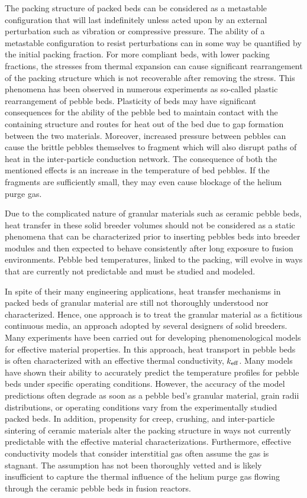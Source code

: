 The packing structure of packed beds can be considered as a metastable configuration that will last indefinitely unless acted upon by an external perturbation such as vibration or compressive pressure.\cite{Jaeger1996} The ability of a metastable configuration to resist perturbations can in some way be quantified by the initial packing fraction. For more compliant beds, with lower packing fractions, the stresses from thermal expansion can cause significant rearrangement of the packing structure which is not recoverable after removing the stress. This phenomena has been observed in numerous experiments as so-called plastic rearrangement of pebble beds.\cite{Reimann:2002kl,Reimann:2000tw,Zhang2015} Plasticity of beds may have significant consequences for the ability of the pebble bed to maintain contact with the containing structure and routes for heat out of the bed due to gap formation between the two materials. Moreover, increased pressure between pebbles can cause the brittle pebbles themselves to fragment which will also disrupt paths of heat in the inter-particle conduction network. The consequence of both the mentioned effects is an increase in the temperature of bed pebbles. If the fragments are sufficiently small, they may even cause blockage of the helium purge gas. 

Due to the complicated nature of granular materials such as ceramic pebble beds, heat transfer in these solid breeder volumes should not be considered as a static phenomena that can be characterized prior to inserting pebbles beds into breeder modules and then expected to behave consistently after long exposure to fusion environments. Pebble bed temperatures, linked to the packing, will evolve in ways that are currently not predictable and must be studied and modeled.

In spite of their many engineering applications, heat transfer mechanisms in packed beds of granular material are still not thoroughly understood nor characterized. Hence, one approach is to treat the granular material as a fictitious continuous media, an approach adopted by several designers of solid breeders. Many experiments have been carried out for developing phenomenological models for effective material properties. In this approach, heat transport in pebble beds is often characterized with an effective thermal conductivity, $k_\text{eff}$. Many models have shown their ability to accurately predict the temperature profiles for pebble beds under specific operating conditions. However, the accuracy of the model predictions often degrade as soon as a pebble bed's granular material, grain radii distributions, or operating conditions vary from the experimentally studied packed beds. In addition, propensity for creep, crushing, and inter-particle sintering of ceramic materials alter the packing structure in ways not currently predictable with the effective material characterizations. Furthermore, effective conductivity models that consider interstitial gas often assume the gas is stagnant. The assumption has not been thoroughly vetted and is likely insufficient to capture the thermal influence of the helium purge gas flowing through the ceramic pebble beds in fusion reactors.

